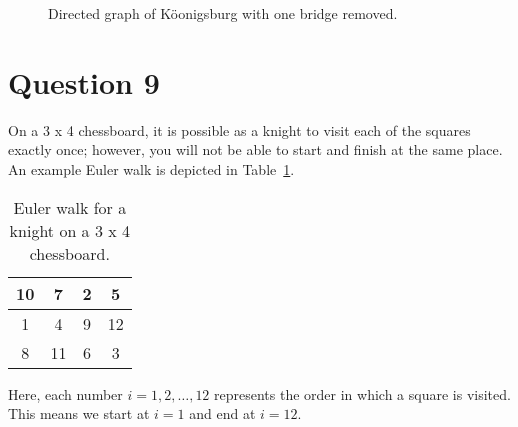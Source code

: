 \documentclass[11pt, oneside]{article}   	%
\begin{document}
\begin{figure}[h]
\centering

\caption{Directed graph of K{\"o}onigsburg with one bridge removed.}
\label{euler path}
\end{figure}


\section*{Question 9}

On a 3 x 4 chessboard, it is possible as a knight to visit each of the squares exactly once; however, you will not be able to start and finish at the same place. An example Euler walk is depicted in Table~\ref{euler walk}.

\begin{table}[h]                                          %
\begin{center}
\begin{tabular}{| c | c | c | c |}            %
    
    \hline
    10 & 7 & 2 & 5 \\
    \hline
     1 & 4 & 9 & 12 \\
     \hline
     8 & 11 & 6 & 3\\
     \hline

\end{tabular}
\end{center}
\caption{Euler walk for a knight on a 3 x 4 chessboard.}
\label{euler walk}
\end{table}


Here, each number $i = 1, 2, \ldots , 12$ represents the order in which a square is visited. This means we start at $i=1$ and end at $i=12$.
\end{document}
